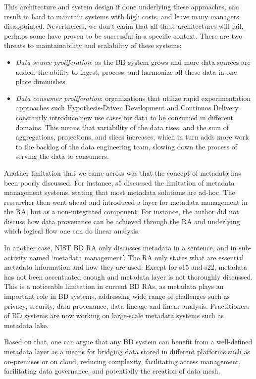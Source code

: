 \documentclass{ieeeaccess}
\begin{document}
This architecture and system design if done underlying these approaches, can result in hard to maintain systems with high costs, and leave many managers disappointed. Nevertheless, we don't claim that all these architectures will fail, perhaps some have proven to be successful in a specific context. There are two threats to maintainability and scalability of these systems; 

\begin{itemize}
    \item \emph{Data source proliferation}: as the BD system grows and more data
    sources are added, the ability to ingest, process, and harmonize all these data in one place diminishes.
    \item \emph{Data consumer proliferation}: organizations that utilize rapid experimentation approaches such Hypothesis-Driven Development and Continuos Delivery constantly introduce new use cases for data to be consumed in different domains. This means that variability of the data rises, and the sum of aggregations, projections, and slices increases, which in turn adds more work to the backlog of the data engineering team, slowing down the process of serving the data to consumers.
\end{itemize}

Another limitation that we came across was that the concept of metadata has been poorly discussed. For instance, s5 discussed the limitation of metadata management systems, stating that most metadata solutions are ad-hoc. The researcher then went ahead and introduced a layer for metadata management in the RA, but as a non-integrated component. For instance, the author did not discuss how data provenance can be achieved through the RA and underlying which logical flow one can do linear analysis. 

In another case, NIST BD RA only discusses metadata in a sentence, and in sub-activity named ‘metadata management’. The RA only states what are essential metadata information and how they are used. Except for s15 and s22, metadata has not been accentuated enough and metadata layer is not thoroughly discussed. This is a noticeable limitation in current BD RAs, as metadata plays an important role in BD systems, addressing wide range of challenges such as privacy, security, data provenance, data lineage and linear analysis. Practitioners of BD systems are now working on large-scale metadata systems such as metadata lake.

Based on that, one can argue that any BD system can benefit from a well-defined metadata layer as a means for bridging data stored in different platforms such as on-premises or on cloud, reducing complexity, facilitating access management, facilitating data governance, and potentially the creation of data mesh.
\end{document}
